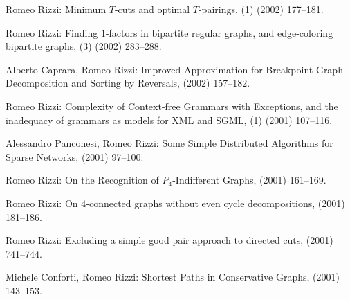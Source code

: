 \begin{etaremune}
  \item {\sc Romeo Rizzi:}
   \newblock  Minimum $T$-cuts and optimal $T$-pairings,
   (1) (2002) 177--181.

  \item {\sc Romeo Rizzi:}
   \newblock  Finding $1$-factors in bipartite regular graphs,
              and edge-coloring bipartite graphs,
   (3) (2002) 283--288. 

  \item {\sc Alberto Caprara, Romeo Rizzi:}
   \newblock  Improved Approximation for Breakpoint Graph Decomposition
              and Sorting by Reversals,
    (2002) 157--182.

  \item {\sc Romeo Rizzi:}
   \newblock  Complexity of Context-free Grammars with Exceptions,
              and the inadequacy of grammars as models for XML and SGML,
   (1) (2001) 107--116.

  \item {\sc Alessandro Panconesi, Romeo Rizzi:}
   \newblock  Some Simple Distributed Algorithms for Sparse Networks,
    (2001) 97--100.

  \item {\sc Romeo Rizzi:}
   \newblock  On the Recognition of $P_4$-Indifferent Graphs,
    (2001) 161--169.

  \item {\sc Romeo Rizzi:}
   \newblock  On $4$-connected graphs without even cycle decompositions,
    (2001) 181--186.

  \item {\sc Romeo Rizzi:}
   \newblock  Excluding a simple good pair approach to directed cuts,
    (2001) 741--744.

  \item {\sc Michele Conforti, Romeo Rizzi:}  
   \newblock  Shortest Paths in Conservative Graphs,
    (2001) 143--153.


\end{etaremune}
